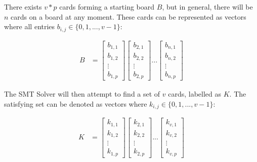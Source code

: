 \documentclass[pageno]{jpaper}
\begin{document}
There exists $v*p$ cards forming a starting board $B$, but in general, there will be $n$ cards on a board at any moment. These cards can be represented as vectors where all entries $b_{i,j} \in \{0,1, ... , v-1\}$:

\begin{align}
    B &= \begin{bmatrix}
           b_{1,1} \\
           b_{1,2} \\
           \vdots \\
           b_{1,p}
         \end{bmatrix}
         \begin{bmatrix}
           b_{2,1} \\
           b_{2,2} \\
           \vdots \\
           b_{2,p}
         \end{bmatrix} ... 
          \begin{bmatrix}
           b_{n,1} \\
           b_{n,2} \\
           \vdots \\
           b_{n,p}
         \end{bmatrix}
  \end{align}
  
The SMT Solver will then attempt to find a set of $v$ cards, labelled as $K$. The satisfying set can be denoted as vectors where $k_{i,j} \in \{0,1, ... , v-1\}$:

\begin{align}
    K &= \begin{bmatrix}
           k_{1,1} \\
           k_{1,2} \\
           \vdots \\
           k_{1,p}
         \end{bmatrix}
         \begin{bmatrix}
           k_{2,1} \\
           k_{2,2} \\
           \vdots \\
           k_{2,p}
         \end{bmatrix} ... 
          \begin{bmatrix}
           k_{v,1} \\
           k_{v,2} \\
           \vdots \\
           k_{v,p}
         \end{bmatrix}
  \end{align}
\end{document}
